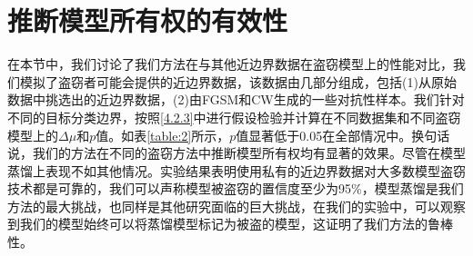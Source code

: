 \section{推断模型所有权的有效性}\label{5.5}

在本节中，我们讨论了我们方法在与其他近边界数据在盗窃模型上的性能对比，我们模拟了盗窃者可能会提供的近边界数据，该数据由几部分组成，包括(1)从原始数据中挑选出的近边界数据，(2)由FGSM和CW生成的一些对抗性样本。我们针对不同的目标分类边界，按照\ref{4.2.3}中进行假设检验并计算在不同数据集和不同盗窃模型上的$\Delta\mu$和$p$值。如表\ref{table:2}所示，$p$值显著低于0.05在全部情况中。换句话说，我们的方法在不同的盗窃方法中推断模型所有权均有显著的效果。尽管在模型蒸馏上表现不如其他情况。实验结果表明使用私有的近边界数据对大多数模型盗窃技术都是可靠的，我们可以声称模型被盗窃的置信度至少为95\%，模型蒸馏是我们方法的最大挑战，也同样是其他研究面临的巨大挑战，在我们的实验中，可以观察到我们的模型始终可以将蒸馏模型标记为被盗的模型，这证明了我们方法的鲁棒性。


